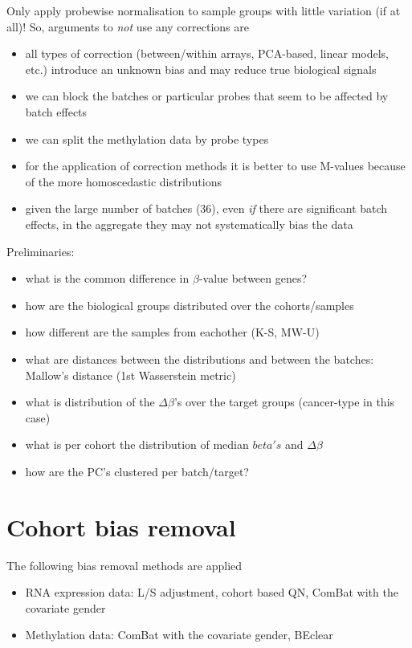 \documentclass[a4paper,10pt]{article}
\begin{document}
Only apply probewise normalisation to sample groups with little variation (if at all)!
%
So, arguments to \textit{not} use any corrections are 
\begin{itemize}
 \item all types of correction (between/within arrays, PCA-based, linear models, etc.) introduce an unknown bias and may reduce true biological signals 
 \item we can block the batches or particular probes that seem to be affected by batch effects
 \item we can split the methylation data by probe types
 \item for the application of correction methods it is better to use M-values because of the more homoscedastic distributions
 \item given the large number of batches ($36$), even \textit{if} there are significant batch effects, in the aggregate they may not systematically bias the data
\end{itemize}

%
Preliminaries:
\begin{itemize}
 \item what is the common difference in $\beta$-value between genes?
 \item how are the biological groups distributed over the cohorts/samples
 \item how different are the samples from eachother (K-S, MW-U)
 \item what are distances between the distributions and between the batches: Mallow’s distance (1st Wasserstein metric)
 \item what is distribution of the $\Delta \beta$'s over the target groups (cancer-type in this case)
 \item what is per cohort the distribution of median $beta's$ and $\Delta \beta$
 \item how are the PC's clustered per batch/target?
\end{itemize}
%
\section{Cohort bias removal}
%
The following bias removal methods are applied
%
\begin{itemize}
\item RNA expression data: L/S adjustment, cohort based QN, ComBat with the covariate gender
\item Methylation data: ComBat with the covariate gender, BEclear 
\end{itemize}
\end{document}
